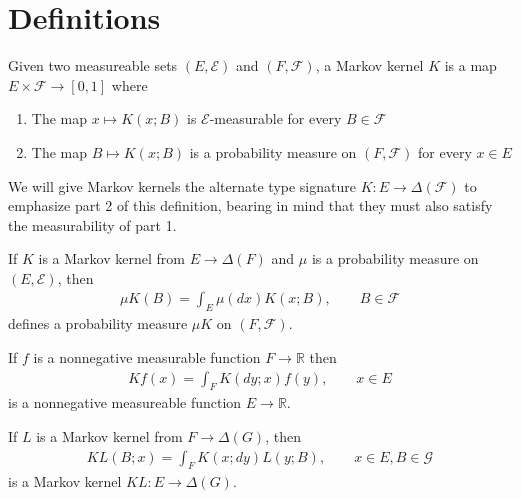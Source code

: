 \section{Definitions}
\begin{definition}
Given two measureable sets $(E,\mathcal{E})$ and $(F,\mathcal{F})$, a Markov kernel $K$ is a map $E\times \mathcal{F} \to [0,1]$ where
\begin{enumerate}
    \item The map $x\mapsto K(x;B)$ is $\mathcal{E}$-measurable for every $B\in\mathcal{F}$
    \item The map $B\mapsto K(x;B)$ is a probability measure on $(F,\mathcal{F})$ for every $x\in E$ 
\end{enumerate}

We will give Markov kernels the alternate type signature $K:E\to \Delta(\mathcal{F})$ to emphasize part 2 of this definition, bearing in mind that they must also satisfy the measurability of part 1.
\end{definition}

\begin{definition}\label{def:kernel_products}
If $K$ is a Markov kernel from $E\to \Delta(F)$ and $\mu$ is a probability measure on $(E,\mathcal{E})$, then
\begin{align}
    \mu K(B)=\int_E \mu(dx) K(x;B),\qquad B\in\mathcal{F}
\end{align}
defines a probability measure $\mu K$ on $(F,\mathcal{F})$.

If $f$ is a nonnegative measurable function $F\to \mathbb{R}$ then
\begin{align}
    Kf(x) = \int_F K(dy;x)f(y), \qquad x\in E
\end{align}
is a nonnegative measureable function $E\to \mathbb{R}$.

If $L$ is a Markov kernel from $F\to \Delta(G)$, then
\begin{align}
    KL(B;x) = \int_F K(x;dy) L(y;B),\qquad x\in E, B\in \mathcal{G}
\end{align}
is a Markov kernel $KL:E\to \Delta(G)$. \cite{cinlar_probability_2011}
\end{definition}